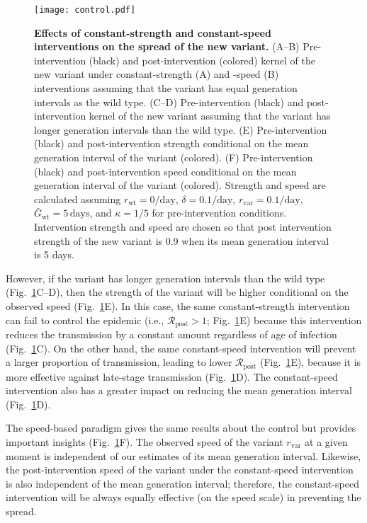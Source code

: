 \documentclass[12pt]{article}
\newcommand{\fref}[1]{Fig.~\ref{fig:#1}}
\newcommand{\vvvar}{\mathrm{var}}
\newcommand{\wwwt}{\mathrm{wt}}
\newcommand{\rx}[1]{\ensuremath{{r}_{#1}}\xspace}
\newcommand{\rw}{\rx{\wwwt}}
\newcommand{\rv}{\rx{\vvvar}}
\newcommand{\Rx}[1]{\ensuremath{{\mathcal R}_{#1}}\xspace}
\newcommand{\Ry}[1]{\Rx{\mathrm{#1}}}
\newcommand{\pday}{\ensuremath{/\textrm{day}}}
\newcommand{\Gx}[1]{\ensuremath{{\bar G}_{#1}}\xspace}
\newcommand{\Gy}[1]{\Gx{\mathrm{#1}}}
\begin{document}
\begin{figure}[!th]
\texttt{[image: control.pdf]}
\caption{
\textbf{Effects of constant-strength and constant-speed interventions on the spread of the new variant.}
(A--B) Pre-intervention (black) and post-intervention (colored) kernel of the new variant under constant-strength (A) and -speed (B) interventions assuming that the variant has equal generation intervals as the wild type.
(C--D) Pre-intervention (black) and post-intervention kernel of the new variant assuming that the variant has longer generation intervals than the wild type.
(E) Pre-intervention (black) and post-intervention strength conditional on the mean generation interval of the variant (colored).
(F) Pre-intervention (black) and post-intervention speed conditional on the mean generation interval of the variant (colored).
Strength and speed are calculated assuming $\rw=0\pday$, $\delta=0.1\pday$, $\rv=0.1\pday$, $\Gy{wt}=5\,\textrm{days}$, and $\kappa=1/5$ for pre-intervention conditions.
Intervention strength and speed are chosen so that post intervention strength of the new variant is 0.9 when its mean generation interval is 5 days.
}
\label{fig:strengthspeed}
\end{figure}

However, if the variant has longer generation intervals than the wild type (\fref{strengthspeed}C--D),  then the strength of the variant will be higher conditional on the observed speed (\fref{strengthspeed}E).
In this case, the same constant-strength intervention can fail to control the epidemic (i.e., $\Ry{post} > 1$; \fref{strengthspeed}E) because this intervention reduces the transmission by a constant amount regardless of age of infection (\fref{strengthspeed}C).
On the other hand, the same constant-speed intervention will prevent a larger proportion of transmission, leading to lower $\Ry{post}$ (\fref{strengthspeed}E), because it is more effective against late-stage transmission (\fref{strengthspeed}D).
The constant-speed intervention also has a greater impact on reducing the mean generation interval (\fref{strengthspeed}D).

The speed-based paradigm gives the same results about the control but provides important insights (\fref{strengthspeed}F).
The observed speed of the variant $\rv$ at a given moment is independent of our estimates of its mean generation interval.
Likewise, the post-intervention speed of the variant under the constant-speed intervention is also independent of the mean generation interval;
therefore, the constant-speed intervention will be always equally effective (on the speed scale) in preventing the spread.
\end{document}
